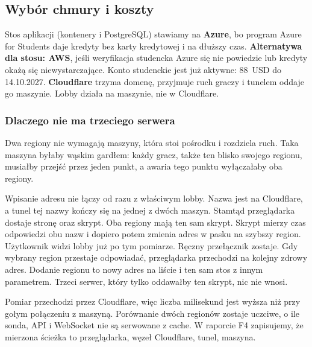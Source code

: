 \documentclass[12pt,a4paper]{article}
\begin{document}
\subsection{Wybór chmury i koszty}
\label{sec:chmura}
Stos aplikacji (kontenery i PostgreSQL) stawiamy na \textbf{Azure}, bo program
Azure for Students daje kredyty bez karty kredytowej i na dłuższy czas.
\textbf{Alternatywa dla stosu: AWS}, jeśli weryfikacja studencka Azure się nie
powiedzie lub kredyty okażą się niewystarczające. Konto studenckie jest już
aktywne: 88~USD do 14.10.2027. \textbf{Cloudflare} trzyma domenę, przyjmuje ruch
graczy i tunelem oddaje go maszynie. Lobby działa na maszynie, nie w Cloudflare.

\subsubsection{Dlaczego nie ma trzeciego serwera}
Dwa regiony nie wymagają maszyny, która stoi pośrodku i rozdziela ruch. Taka
maszyna byłaby wąskim gardłem: każdy gracz, także ten blisko swojego regionu,
musiałby przejść przez jeden punkt, a awaria tego punktu wyłączałaby oba regiony.

Wpisanie adresu nie łączy od razu z właściwym lobby. Nazwa jest na Cloudflare,
a tunel tej nazwy kończy się na jednej z dwóch maszyn. Stamtąd przeglądarka
dostaje stronę oraz skrypt. Oba regiony mają ten sam skrypt. Skrypt mierzy czas
odpowiedzi obu nazw i dopiero potem zmienia adres w pasku na szybszy region.
Użytkownik widzi lobby już po tym pomiarze. Ręczny przełącznik zostaje. Gdy
wybrany region przestaje odpowiadać, przeglądarka przechodzi na kolejny zdrowy
adres. Dodanie regionu to nowy adres na liście i ten sam stos z innym parametrem.
Trzeci serwer, który tylko oddawałby ten skrypt, nic nie wnosi.

Pomiar przechodzi przez Cloudflare, więc liczba milisekund jest wyższa niż przy
gołym połączeniu z maszyną. Porównanie dwóch regionów zostaje uczciwe, o ile
sonda, API i WebSocket nie są serwowane z cache. W raporcie F4 zapisujemy, że
mierzona ścieżka to przeglądarka, węzeł Cloudflare, tunel, maszyna.
\end{document}

